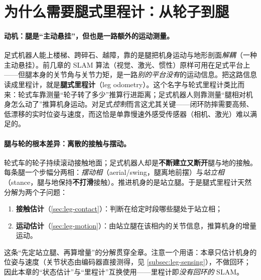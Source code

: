 \section{为什么需要腿式里程计：从轮子到腿}
\label{sec:leg-why}

\paragraph{动机：腿是“主动悬挂”，但也是一路额外的运动测量。}
足式机器人能上楼梯、跨碎石、越障，靠的是腿把机身运动与地形剖面\emph{解耦}（一种主动悬挂）\cite{carlone2026handbook}。前几章的 SLAM 算法（视觉、激光、惯性）原样可用在足式平台上——但腿本身的关节角与关节力矩，是一路\emph{别的平台没有}的运动信息。把这路信息读成里程计，就是\textbf{腿式里程计}（leg odometry）。这个名字与轮式里程计类比而来：轮式车靠测量“轮子转了多少”推算行进距离；足式机器人则靠测量“腿相对机身怎么动了”推算机身运动。对足式\emph{控制}而言这尤其关键——闭环防摔需要高频、低漂移的实时位姿与速度，而这恰是单靠慢速外感受传感器（相机、激光）难以满足的。

\paragraph{腿与轮的根本差异：离散的接触与摆动。}
轮式车的轮子持续滚动接触地面；足式机器人却是\textbf{不断建立又断开}腿与地的接触。每条腿一个步幅分两相：\emph{摆动相}（aerial/swing，腿离地前摆）与\emph{站立相}（stance，腿与地保持\textbf{不打滑}接触）。推进机身的是站立腿。于是腿式里程计天然分解为两个子问题：
\begin{enumerate}
  \item \textbf{接触估计}（\cref{sec:leg-contact}）：判断在给定时段哪些腿处于站立相；
  \item \textbf{运动估计}（\cref{sec:leg-motion}）：由站立腿在该相内的关节信息，推算机身的增量运动。
\end{enumerate}
这条“先定站立腿、再算增量”的分解贯穿全章。注意一个用语：本章只估计机身的位姿与速度（关节状态由编码器直接测得，见 \cref{subsec:leg-sensing}），不做回环；因此本章的“状态估计”与“里程计”互换使用——里程计即\emph{没有回环的} SLAM\cite{carlone2026handbook}。

